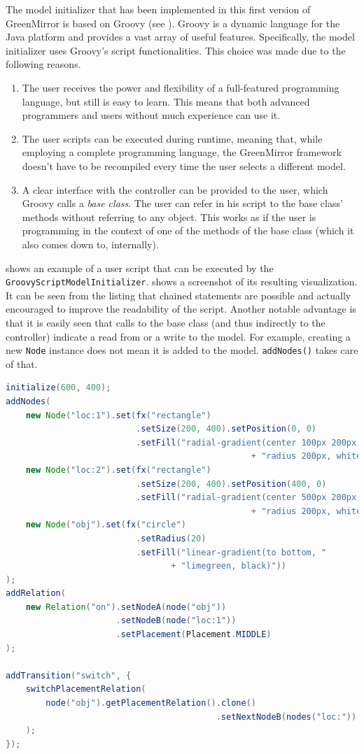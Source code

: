 \documentclass[a4paper]{article}
\begin{document}
The model initializer that has been implemented in this first version of GreenMirror is based on Groovy (see \cite{groovy}). Groovy is a dynamic language for the Java platform and provides a vast array of useful features. Specifically, the model initializer uses Groovy's script functionalities. This choice was made due to the following reasons.
\begin{enumerate}
\item The user receives the power and flexibility of a full-featured programming language, but still is easy to learn. This means that both advanced programmers and users without much experience can use it.
\item The user scripts can be executed during runtime, meaning that, while employing a complete programming language, the GreenMirror framework doesn't have to be recompiled every time the user selects a different model.
\item A clear interface with the controller can be provided to the user, which Groovy calls a \emph{base class}. The user can refer in his script to the base class' methods without referring to any object. This works as if the user is programming in the context of one of the methods of the base class (which it also comes down to, internally).
\end{enumerate}
 shows an example of a user script that can be executed by the \lstinline{GroovyScriptModelInitializer}.  shows a screenshot of its resulting visualization. It can be seen from the listing that chained statements are possible and actually encouraged to improve the readability of the script. Another notable advantage is that it is easily seen that calls to the base class (and thus indirectly to the controller) indicate a read from or a write to the model. For example, creating a new \lstinline{Node} instance does not mean it is added to the model. \lstinline{addNodes()} takes care of that.
\begin{lstlisting}[language=java, label={lst:groovyexample}, caption={Example Groovy user script}]
initialize(600, 400);
addNodes(
    new Node("loc:1").set(fx("rectangle")
                          .setSize(200, 400).setPosition(0, 0)
                          .setFill("radial-gradient(center 100px 200px, "
                                                 + "radius 200px, white, red)")),
    new Node("loc:2").set(fx("rectangle")
                          .setSize(200, 400).setPosition(400, 0)
                          .setFill("radial-gradient(center 500px 200px, "
                                                 + "radius 200px, white, red)")),
    new Node("obj").set(fx("circle")
                          .setRadius(20)
                          .setFill("linear-gradient(to bottom, "
                                 + "limegreen, black)"))
);
addRelation(
    new Relation("on").setNodeA(node("obj"))
                      .setNodeB(node("loc:1"))
                      .setPlacement(Placement.MIDDLE)
);

addTransition("switch", {
    switchPlacementRelation(
        node("obj").getPlacementRelation().clone()
                                          .setNextNodeB(nodes("loc:"))
    );
});
\end{lstlisting}
\end{document}

